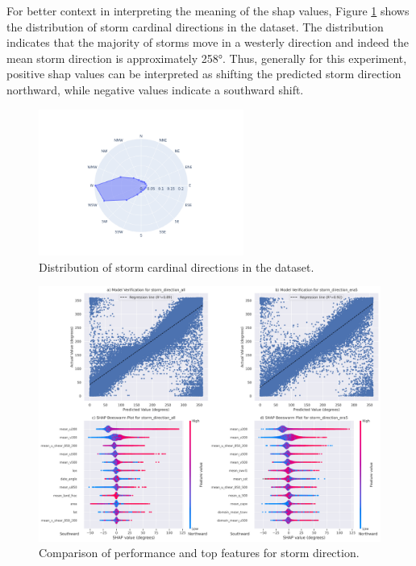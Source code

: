 For better context in interpreting the meaning of the \acrshort{shap} values, Figure \ref{fig:storm_cardinal_directions_distribution} shows the distribution of storm cardinal directions in the dataset. The distribution indicates that the majority of storms move in a westerly direction and indeed the mean storm direction is approximately \ang{258}. Thus, generally for this experiment, positive \acrshort{shap} values can be interpreted as shifting the predicted storm direction northward, while negative values indicate a southward shift.

\begin{figure}[ht]
    \centering
    \includegraphics[width=0.6\textwidth]{../figures/generated/exploration/storm_cardinal_directions_distribution.png}
    \caption{Distribution of storm cardinal directions in the dataset.}
    \label{fig:storm_cardinal_directions_distribution}
\end{figure}

\begin{figure}[ht]
    \centering
    \includegraphics[width=\textwidth]{../figures/generated/experiments/storm_direction/storm_direction_summary.png}
    \caption{Comparison of performance and top features for storm direction.}
    \label{fig:storm_direction_summary}
\end{figure}

